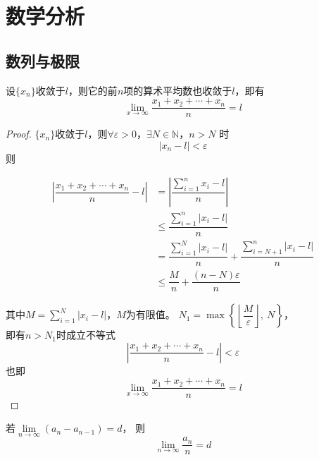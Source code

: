 \chapter{数学分析}

\section{数列与极限}

\begin{proposition}[Cauthy命题]

    设$\{x_n\}$收敛于$l$，则它的前$n$项的算术平均数也收敛于$l$，即有
    $$\lim\limits_{x\to\infty}{\dfrac{x_1 + x_2 + \cdots + x_n}{n}} = l$$

\end{proposition}

\begin{proof}

    $\{x_n\}$收敛于$l$，则$\forall \varepsilon > 0$，$\exists N \in \mathbb{N}$，$n > N$ 时
    $$|x_n - l| < \varepsilon$$
    则

    \begin{align*}
        \left|\dfrac{x_1 + x_2 + \cdots + x_n}{n} - l\right| &= \left|\dfrac{\sum\limits_{i=1}^{n}{x_i - l}}{n}\right|\\
        &\leq \dfrac{\sum\limits_{i=1}^{n}{|x_i - l|}}{n}\\
        &= \dfrac{\sum\limits_{i=1}^{N}{|x_i - l|}}{n} + \dfrac{\sum\limits_{i=N+1}^{n}{|x_i - l|}}{n}\\
        &\leq \dfrac{M}{n} + \dfrac{(n-N)\varepsilon}{n}
    \end{align*}

    其中$M = \sum\limits_{i=1}^{N}{|x_i-l|}$，$M$为有限值。
    $N_1 = \max\left\{\left\lfloor\dfrac{M}{\varepsilon}\right\rfloor,\ N \right\}$，\\
    即有$n>N_1$时成立不等式
    $$\left| \dfrac{x_1 + x_2 + \cdots + x_n}{n} - l \right| < \varepsilon$$
    也即
    $$\lim\limits_{x\to\infty}{\dfrac{x_1 + x_2 + \cdots + x_n}{n}} = l$$

\end{proof}

\begin{corollary}[Cauthy命题推论]

    若$\lim\limits_{n\to\infty}{(a_n - a_{n-1})} = d$，
    则
    $$\lim\limits_{n\to\infty}{\dfrac{a_n}{n}} = d$$

\end{corollary}

